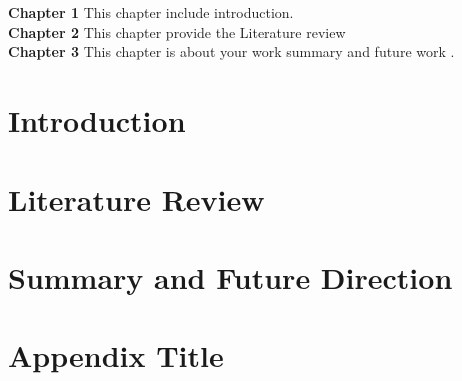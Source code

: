 \documentclass[12pt,a4paper, openany]{report}
\begin{document}
 


\chapter*{} %
\textbf{Chapter 1} This chapter include introduction.\\
\textbf{Chapter 2} This chapter provide the Literature review  \\
\textbf{Chapter 3} This chapter is about your work summary and future work  .\\


\tableofcontents
\chapter{Introduction}

\chapter{Literature Review}

%
\chapter{Summary and Future Direction}

\appendix
 \chapter{Appendix Title}

%
\typeout{}


\end{document}

